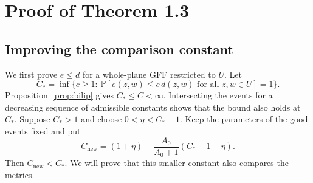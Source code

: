 \documentclass[11pt]{article}
\theoremstyle{definition}
\theoremstyle{remark}
\newcommand{\Pp}{\mathbb P}
\begin{document}
\section{Proof of Theorem 1.3}\label{sec:finish}
\subsection{Improving the comparison constant}
We first prove $e\le d$ for a whole-plane GFF restricted to $U$.
Let
\[
 C_* =\inf\{c\ge1:\ \Pp[e(z,w)\le c\,d(z,w)
                         \text{ for all }z,w\in U]=1\}.
\]
Proposition~\ref{prop:bilip} gives $C_*\le C<\infty$.
Intersecting the events for a decreasing sequence of admissible
constants shows that the bound also holds at $C_*$.
Suppose $C_*>1$ and choose $0<\eta<C_*-1$. Keep the
parameters of the good events fixed and put
\begin{equation}\label{eq:new-C}
 C_{\mathrm{new}}=(1+\eta)+
           \frac{A_0}{A_0+1}(C_*-1-\eta).
\end{equation}
Then $C_{\mathrm{new}}<C_*$. We will prove that this smaller
constant also compares the metrics.
\end{document}
